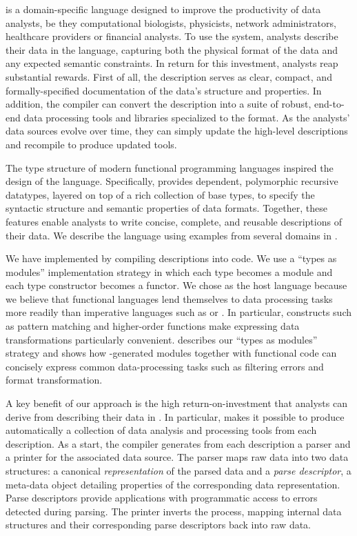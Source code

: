 \documentclass{sigplanconf}
\begin{document}
\padsml{} is a domain-specific language designed to 
improve the productivity of data analysts, be they computational biologists, physicists, network administrators, healthcare providers or financial analysts.
To use the system, analysts describe their data in the \padsml{} language, capturing both the physical format of the data and any expected semantic constraints.  In return for this investment, analysts reap substantial rewards.
First of all, the description
serves as clear, compact, and formally-specified documentation of 
the data's structure and properties.  In addition, the \padsml{}
compiler can convert the description into a suite of robust, end-to-end
data processing tools and libraries specialized
to the format.  As the analysts' data sources evolve over time,
they can simply update the high-level descriptions
and recompile to produce updated tools.


The type structure of modern functional programming languages inspired the design of the \padsml{} language.  
Specifically, \padsml{} provides dependent, polymorphic recursive datatypes, layered on top of a rich collection of base types, to specify the syntactic structure and semantic properties of data
formats.  Together, these features enable analysts to write concise,
complete, and reusable descriptions of their data.  
We describe the \padsml{} language using examples from several domains
in .

We have implemented \padsml{} by compiling descriptions into
\ocaml{} code.  We use a
``types as modules'' implementation strategy in which each \padsml{} type
becomes a module and each \padsml{} type constructor becomes a functor. 
We chose \ml{} as the host language because we believe that 
functional languages lend themselves to data processing tasks more readily than imperative languages such as \C{} or \java{}.  In particular, constructs such as pattern matching and higher-order functions make expressing data transformations particularly convenient.  describes our ``types as modules''
strategy and shows how \padsml{}-generated modules together
with functional \ocaml{} code can concisely express
common
data-processing tasks such as filtering errors and format transformation.

A key benefit of our approach is the high return-on-investment that
analysts can derive from describing their data in \padsml{}.  In particular, \padsml{} makes it possible to produce automatically a collection of data analysis and processing tools from each description.   
As a start, the \padsml{} compiler generates from each description a parser and a printer for the associated data source.  The parser maps raw 
data into two data
structures: a canonical \textit{representation} of the parsed data and
a \textit{parse descriptor}, a meta-data object detailing properties
of the corresponding data representation.  Parse descriptors provide
applications with programmatic access to errors detected during
parsing.  The printer inverts the process, mapping internal data structures
and their corresponding parse descriptors back into raw data.
\end{document}
